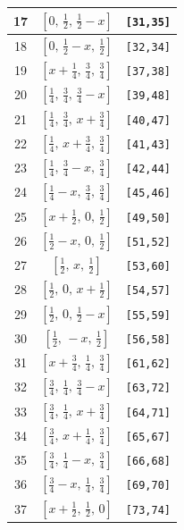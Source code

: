 \documentclass[fleqn,8pt]{jsarticle}
\begin{document}
\begin{longtable}{ccc}
17 & $\left[ 0,\, \frac{1}{2},\, \frac{1}{2} - x \right]$ & {\tt [31,35]} \\ \hline
18 & $\left[ 0,\, \frac{1}{2} - x,\, \frac{1}{2} \right]$ & {\tt [32,34]} \\ \hline
19 & $\left[ x + \frac{1}{4},\, \frac{3}{4},\, \frac{3}{4} \right]$ & {\tt [37,38]} \\ \hline
20 & $\left[ \frac{1}{4},\, \frac{3}{4},\, \frac{3}{4} - x \right]$ & {\tt [39,48]} \\ \hline
21 & $\left[ \frac{1}{4},\, \frac{3}{4},\, x + \frac{3}{4} \right]$ & {\tt [40,47]} \\ \hline
22 & $\left[ \frac{1}{4},\, x + \frac{3}{4},\, \frac{3}{4} \right]$ & {\tt [41,43]} \\ \hline
23 & $\left[ \frac{1}{4},\, \frac{3}{4} - x,\, \frac{3}{4} \right]$ & {\tt [42,44]} \\ \hline
24 & $\left[ \frac{1}{4} - x,\, \frac{3}{4},\, \frac{3}{4} \right]$ & {\tt [45,46]} \\ \hline
25 & $\left[ x + \frac{1}{2},\, 0,\, \frac{1}{2} \right]$ & {\tt [49,50]} \\ \hline
26 & $\left[ \frac{1}{2} - x,\, 0,\, \frac{1}{2} \right]$ & {\tt [51,52]} \\ \hline
27 & $\left[ \frac{1}{2},\, x,\, \frac{1}{2} \right]$ & {\tt [53,60]} \\ \hline
28 & $\left[ \frac{1}{2},\, 0,\, x + \frac{1}{2} \right]$ & {\tt [54,57]} \\ \hline
29 & $\left[ \frac{1}{2},\, 0,\, \frac{1}{2} - x \right]$ & {\tt [55,59]} \\ \hline
30 & $\left[ \frac{1}{2},\, - x,\, \frac{1}{2} \right]$ & {\tt [56,58]} \\ \hline
31 & $\left[ x + \frac{3}{4},\, \frac{1}{4},\, \frac{3}{4} \right]$ & {\tt [61,62]} \\ \hline
32 & $\left[ \frac{3}{4},\, \frac{1}{4},\, \frac{3}{4} - x \right]$ & {\tt [63,72]} \\ \hline
33 & $\left[ \frac{3}{4},\, \frac{1}{4},\, x + \frac{3}{4} \right]$ & {\tt [64,71]} \\ \hline
34 & $\left[ \frac{3}{4},\, x + \frac{1}{4},\, \frac{3}{4} \right]$ & {\tt [65,67]} \\ \hline
35 & $\left[ \frac{3}{4},\, \frac{1}{4} - x,\, \frac{3}{4} \right]$ & {\tt [66,68]} \\ \hline
36 & $\left[ \frac{3}{4} - x,\, \frac{1}{4},\, \frac{3}{4} \right]$ & {\tt [69,70]} \\ \hline
37 & $\left[ x + \frac{1}{2},\, \frac{1}{2},\, 0 \right]$ & {\tt [73,74]} \\ \hline

\end{longtable}
\end{document}
